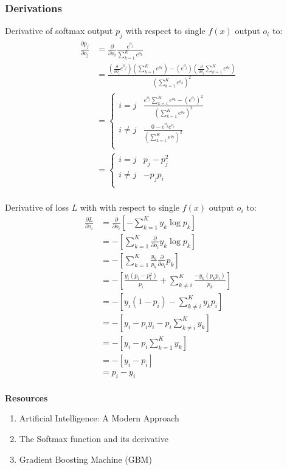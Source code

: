 

\subsubsection{Derivations}
Derivative of softmax output $p_j$ with respect to single $f(x)$ output $o_i$ to:\\
\begin{align*}
    \frac{\partial p_j}{\partial o_j} &= \frac{\partial}{\partial o_i} \frac{e^{o_j}}{\sum^K_{k=1} e^{o_k}} \\
    &= \frac{ (\frac{\partial}{\partial o_i} e^{o_j})(\sum^K_{k=1} e^{o_k}) - (e^{o_j})(\frac{\partial}{\partial o_i} \sum^K_{k=1} e^{o_k}) }{ (\sum^K_{k=1} e^{o_k})^2 }\\
    &= \begin{cases} i = j & \frac{ e^{o_j} \sum^K_{k=1}e^{o_k} - (e^{o_j})^2 }{ (\sum^K_{k=1}e^{o_k})^2 }\\ i \neq j & \frac{ 0 - e^{o_j}e^{o_i} }{ (\sum^K_{k=1}e^{o_k})^2 }\\ \end{cases}\\
    &= \begin{cases} i = j & p_j - p_j^2\\ i \neq j & -p_jp_i\\ \end{cases}\\
\end{align*}

Derivative of loss $L$ with with respect to single $f(x)$ output $o_i$ to:\\
\begin{align*}
    \frac{\partial L}{\partial o_i} &= \frac{\partial}{\partial o_i} \left[- \sum^K_{k=1} y_k \log p_k \right]\\
    &= - \left[\sum^K_{k=1} \frac{\partial}{\partial o_i} y_k \log p_k \right]\\
    &= - \left[\sum^K_{k=1} \frac{y_k}{p_k} \frac{\partial}{\partial o_i}  p_k \right]\\
    &= - \left[ \frac{y_i (p_i - p_i^2)}{p_i} + \sum^K_{k\neq i} \frac{-y_k(p_kp_i)}{p_k} \right]\\
    &= - \left[ y_i (1-p_i) - \sum^K_{k\neq i} y_k p_i \right]\\
    &= - \left[ y_i - p_iy_i - p_i\sum^K_{k\neq i} y_k \right]\\
    &= - \left[ y_i - p_i\sum^K_{k=1} y_k \right]\\
    &= - \left[ y_i - p_i \right]\\
    &=  p_i - y_i\\
\end{align*}

\textbf{Resources}
\begin{enumerate}
    \item Artificial Intelligence: A Modern Approach~\cite{russell1}
    \item The Softmax function and its derivative~\cite{bendersky1}
    \item Gradient Boosting Machine (GBM)~\cite{liu1}
\end{enumerate}
